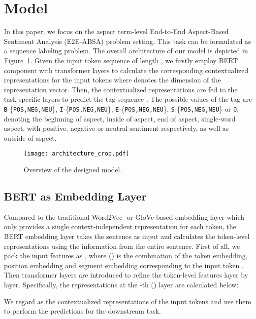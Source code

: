 \documentclass[11pt,a4paper]{article}
\begin{document}
\section{Model}
In this paper, we focus on the aspect term-level End-to-End Aspect-Based Sentiment Analysis (E2E-ABSA) problem setting. This task can be formulated as a sequence labeling problem. The overall architecture of our model is depicted in Figure~\ref{fig:architecture}. Given the input token sequence  of length , we firstly employ BERT component with  transformer layers to calculate the corresponding contextualized representations  for the input tokens where  denotes the dimension of the representation vector. Then, the contextualized representations are fed to the task-specific layers to predict the tag sequence . The possible values of the tag  are \texttt{B}-\{\texttt{POS,NEG,NEU}\}, \texttt{I}-\{\texttt{POS,NEG,NEU}\}, \texttt{E}-\{\texttt{POS,NEG,NEU}\}, \texttt{S}-\{\texttt{POS,NEG,NEU}\} or \texttt{O}, denoting the beginning of aspect, inside of aspect, end of aspect, single-word aspect, with positive, negative or neutral sentiment respectively, as well as outside of aspect.

\begin{figure}
    \centering
    \texttt{[image: architecture\_crop.pdf]}
    \caption{Overview of the designed model.}
    \label{fig:architecture}
\end{figure}

\subsection{BERT as Embedding Layer}
Compared to the traditional Word2Vec- or GloVe-based embedding layer which only provides a single context-independent representation for each token, the BERT embedding layer takes the sentence as input and calculates the token-level representations using the information from the entire sentence. First of all, we pack the input features as , where  () is the combination of the token embedding, position embedding and segment embedding corresponding to the input token . Then  transformer layers are introduced to refine the token-level features layer by layer. Specifically, the representations  at the -th () layer are calculated below:

We regard  as the contextualized representations of the input tokens and use them to perform the predictions for the downstream task. 
\end{document}
